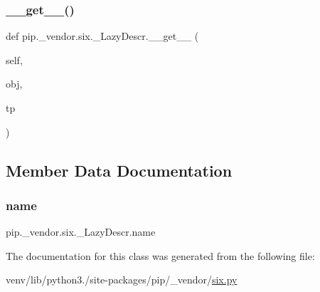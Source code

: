 \subsubsection{\texorpdfstring{\+\_\+\+\_\+get\+\_\+\+\_\+()}{\_\_get\_\_()}}
{\footnotesize\ttfamily def pip.\+\_\+vendor.\+six.\+\_\+\+Lazy\+Descr.\+\_\+\+\_\+get\+\_\+\+\_\+ (\begin{DoxyParamCaption}\item[{}]{self,  }\item[{}]{obj,  }\item[{}]{tp }\end{DoxyParamCaption})}



\subsection{Member Data Documentation}
\mbox{\label{classpip_1_1__vendor_1_1six_1_1__LazyDescr_ac79dd785588d4b38378ddb12da59caf2}} 
\subsubsection{\texorpdfstring{name}{name}}
{\footnotesize\ttfamily pip.\+\_\+vendor.\+six.\+\_\+\+Lazy\+Descr.\+name}



The documentation for this class was generated from the following file\+:\begin{DoxyCompactItemize}
\item 
venv/lib/python3./site-\/packages/pip/\+\_\+vendor/\hyperlink{pip_2__vendor_2six_8py}{six.\+py}\end{DoxyCompactItemize}
